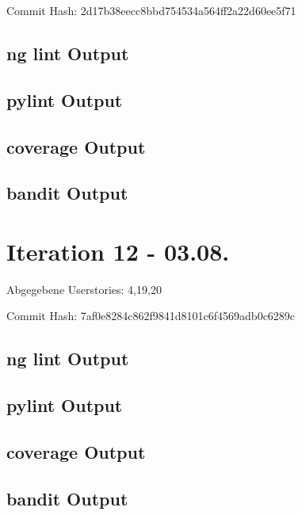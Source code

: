 \documentclass[accentcolor=tud0b,12pt,paper=a4]{tudreport}
\begin{document}
	Commit Hash: 2d17b38eecc8bbd754534a564ff2a22d60ee5f71
	
	\subsection*{ng lint Output}
	
	
	\subsection*{pylint Output}
	
	
	\subsection*{coverage Output}
	
	
	\subsection*{bandit Output}
	

\section*{Iteration 12 - 03.08.}
	Abgegebene Userstories: 4,19,20
	
	Commit Hash: 7af0e8284c862f9841d8101c6f4569adb0c6289c
	
	\subsection*{ng lint Output}
	
	
	\subsection*{pylint Output}
	
	
	\subsection*{coverage Output}
	
	
	\subsection*{bandit Output}
	
\end{document}
